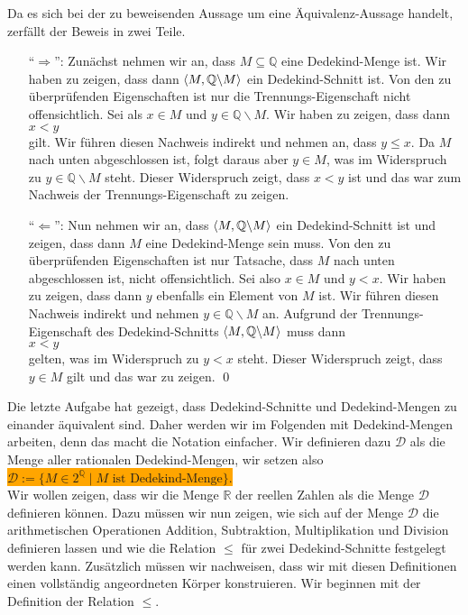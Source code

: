 \solution
Da es sich bei der zu beweisenden Aussage um eine Äquivalenz-Aussage handelt,  zerfällt der Beweis
in zwei Teile.
\begin{enumerate}
\item[``$\Rightarrow$'':] Zunächst nehmen wir an, dass $M \subseteq \mathbb{Q}$ eine Dedekind-Menge ist.  Wir haben zu
      zeigen, dass dann $\pair(M,\mathbb{Q} \backslash M)$ ein Dedekind-Schnitt ist.  Von den zu
      überprüfenden Eigenschaften ist nur die Trennungs-Eigenschaft nicht offensichtlich.
      Sei als $x \in M$ und $y \in \mathbb{Q} \backslash M$.  Wir haben zu zeigen, dass dann
      \\[0.2cm]
      \hspace*{1.3cm}
      $x < y$
      \\[0.2cm]
      gilt.  Wir führen diesen Nachweis indirekt und nehmen an, dass $y \leq x$.  Da $M$ nach unten
      abgeschlossen ist, folgt daraus aber $y \in M$, was im Widerspruch zu $y \in \mathbb{Q} \backslash M$ steht.
      Dieser Widerspruch zeigt, dass $x < y$ ist und das war zum Nachweis der Trennungs-Eigenschaft
      zu zeigen.
\item[``$\Leftarrow$'':] Nun nehmen wir an, dass $\pair(M, \mathbb{Q} \backslash M)$ ein Dedekind-Schnitt ist und
     zeigen, dass dann $M$ eine Dedekind-Menge sein muss.  Von den zu überprüfenden Eigenschaften
     ist nur Tatsache, dass $M$ nach unten abgeschlossen ist, nicht offensichtlich.  Sei also $x \in M$
     und $y < x$.  Wir haben zu zeigen, dass dann $y$ ebenfalls ein Element von $M$ ist.  Wir führen
     diesen Nachweis indirekt und nehmen $y \in \mathbb{Q} \backslash M$ an.  Aufgrund der
     Trennungs-Eigenschaft des Dedekind-Schnitts $\pair(M, \mathbb{Q} \backslash M)$ muss dann
     \\[0.2cm]
     \hspace*{1.3cm}
     $x < y$
     \\[0.2cm]
     gelten, was im Widerspruch zu $y < x$ steht.  Dieser Widerspruch zeigt, dass $y \in M$ gilt
     und das war zu zeigen.  \qed
\end{enumerate}

Die letzte Aufgabe hat gezeigt, dass Dedekind-Schnitte und Dedekind-Mengen zu einander äquivalent
sind.  Daher werden wir im Folgenden mit Dedekind-Mengen
arbeiten,  denn das macht die Notation einfacher.  Wir definieren dazu
$\mathcal{D}$ als die Menge aller rationalen Dedekind-Mengen, wir setzen also
\\[0.2cm]
\hspace*{1.3cm}
\colorbox{orange}{
$\mathcal{D} := \bigl\{ M \in 2^{\mathbb{Q}} \mid \mbox{$M$ ist Dedekind-Menge} \bigr\}$.}
\\[0.2cm]
Wir wollen zeigen, dass wir die Menge $\mathbb{R}$ der reellen Zahlen als die Menge $\mathcal{D}$
definieren können.  Dazu müssen wir nun zeigen, wie sich auf der Menge $\mathcal{D}$ die
arithmetischen Operationen Addition, Subtraktion, Multiplikation und Division definieren 
lassen und wie die Relation $\leq$ für zwei Dedekind-Schnitte festgelegt
werden kann.  Zusätzlich müssen wir nachweisen, dass wir mit diesen Definitionen einen vollständig
angeordneten Körper konstruieren.  Wir beginnen mit der Definition der Relation $\leq$.

